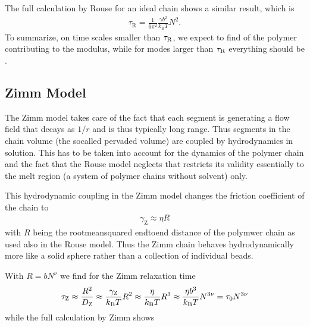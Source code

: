 \documentclass[letterpaper,10pt,english]{sphinxmanual}
\begin{document}
\sphinxAtStartPar
The full calculation by Rouse for an ideal chain shows a similar result, which is
\begin{equation*}
\begin{split}\tau_\mathrm{R}=\frac{1}{6 \pi^{2}} \frac{\gamma b^{2}}{k_\mathrm{B} T} N^{2}.\end{split}
\end{equation*}
\sphinxAtStartPar
To summarize, on time scales smaller than \(\tau_{\rm R}\), we expect to find  of the polymer contributing to the modulus, while for modes larger than \(\tau_{\rm R}\) everything should be .


\subsection{Zimm Model}
\label{\detokenize{notebooks/L25/1_polymer_dynamics:Zimm-Model}}
\sphinxAtStartPar
The Zimm model takes care of the fact that each segment is generating a flow field that decays as \(1/r\) and is thus typically long range. Thus segments in the chain volume (the so\sphinxhyphen{}called pervaded volume) are coupled by hydrodynamics in solution. This has to be taken into account for the dynamics of the polymer chain and the fact that the Rouse model neglects that restricts its validity essentially to the melt region (a system of polymer chains without solvent) only.

\sphinxAtStartPar
This hydrodynamic coupling in the Zimm model changes the friction coefficient of the chain to
\begin{equation*}
\begin{split}\gamma_\mathrm{Z}\approx \eta R\end{split}
\end{equation*}
\sphinxAtStartPar
with \(R\) being the root\sphinxhyphen{}mean\sphinxhyphen{}squared end\sphinxhyphen{}to\sphinxhyphen{}end distance of the polymwer chain as used also in the Rouse model. Thus the Zimm chain behaves hydrodynamically more like a solid sphere rather than a collection of individual beads.

\sphinxAtStartPar
With \(R=bN^{\nu}\) we find for the Zimm relaxation time
\begin{equation*}
\begin{split}\tau_{\rm Z} \approx \frac{R^{2}}{D_{\rm Z}} \approx \frac{\gamma_{\rm Z}}{k_{\rm B} T} R^{2} \approx \frac{\eta}{k_{\rm B} T} R^{3} \approx \frac{\eta b^{3}}{k_{\rm B} T} N^{3 \nu}=\tau_{0} N^{3 \nu}\end{split}
\end{equation*}
\sphinxAtStartPar
while the full calculation by Zimm shows
\end{document}
